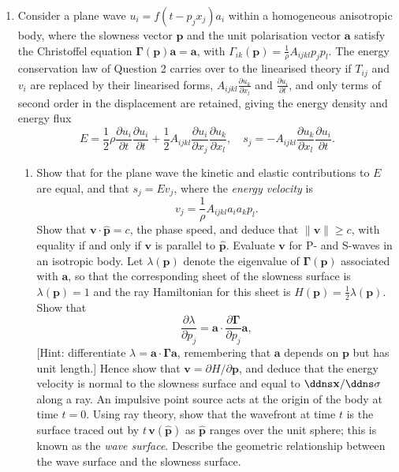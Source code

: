 \begin{enumerate}
\item Consider a plane wave $u_{i}=f(t-p_{j}x_{j})a_{i}$ within a homogeneous anisotropic body, where the slowness vector $\mathbf{p}$ and the unit polarisation vector $\mathbf{a}$ satisfy the Christoffel equation $\bm{\Gamma}(\mathbf{p})\mathbf{a}=\mathbf{a}$, with $\Gamma_{ik}(\mathbf{p})=\frac{1}{\rho}A_{ijkl}p_{j}p_{l}$. The energy conservation law of Question 2 carries over to the linearised theory if $T_{ij}$ and $v_{i}$ are replaced by their linearised forms, $A_{ijkl}\frac{\partial u_{k}}{\partial x_{l}}$ and $\frac{\partial u_{i}}{\partial t}$, and only terms of second order in the displacement are retained, giving the energy density and energy flux
\begin{equation*}
    E=\frac{1}{2}\rho\frac{\partial u_{i}}{\partial t}\frac{\partial u_{i}}{\partial t}+\frac{1}{2}A_{ijkl}\frac{\partial u_{i}}{\partial x_{j}}\frac{\partial u_{k}}{\partial x_{l}}, \quad s_{j}=-A_{ijkl}\frac{\partial u_{k}}{\partial x_{l}}\frac{\partial u_{i}}{\partial t}.
\end{equation*}
\begin{enumerate}
    \item Show that for the plane wave the kinetic and elastic contributions to $E$ are equal, and that $s_{j}=Ev_{j}$, where the \emph{energy velocity} is
    \begin{equation*}
        v_{j}=\frac{1}{\rho}A_{ijkl}a_{i}a_{k}p_{l}.
    \end{equation*}
    Show that $\mathbf{v}\cdot\hat{\mathbf{p}}=c$, the phase speed, and deduce that $\|\mathbf{v}\|\ge c$, with equality if and only if $\mathbf{v}$ is parallel to $\hat{\mathbf{p}}$. Evaluate $\mathbf{v}$ for P- and S-waves in an isotropic body.
    \hardp Let $\lambda(\mathbf{p})$ denote the eigenvalue of $\bm{\Gamma}(\mathbf{p})$ associated with $\mathbf{a}$, so that the corresponding sheet of the slowness surface is $\lambda(\mathbf{p})=1$ and the ray Hamiltonian for this sheet is $H(\mathbf{p})=\frac{1}{2}\lambda(\mathbf{p})$. Show that
    \begin{equation*}
        \frac{\partial\lambda}{\partial p_{j}}=\mathbf{a}\cdot\frac{\partial\bm{\Gamma}}{\partial p_{j}}\mathbf{a},
    \end{equation*}
    [Hint: differentiate $\lambda=\mathbf{a}\cdot\bm{\Gamma}\mathbf{a}$, remembering that $\mathbf{a}$ depends on $\mathbf{p}$ but has unit length.] Hence show that $\mathbf{v}=\partial H/\partial\mathbf{p}$, and deduce that the energy velocity is normal to the slowness surface and equal to $\ddns\mathbf{x}/\ddns\sigma$ along a ray.
    \hardp An impulsive point source acts at the origin of the body at time $t=0$. Using ray theory, show that the wavefront at time $t$ is the surface traced out by $t\,\mathbf{v}(\hat{\mathbf{p}})$ as $\hat{\mathbf{p}}$ ranges over the unit sphere; this is known as the \emph{wave surface}. Describe the geometric relationship between the wave surface and the slowness surface.
\end{enumerate}
\end{enumerate}
